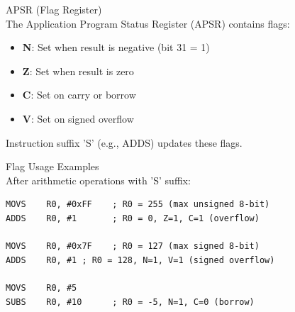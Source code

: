 \begin{definition}{APSR (Flag Register)}\\
The Application Program Status Register (APSR) contains flags:
\begin{itemize}
  \item \textbf{N}: Set when result is negative (bit 31 = 1)
  \item \textbf{Z}: Set when result is zero
  \item \textbf{C}: Set on carry or borrow
  \item \textbf{V}: Set on signed overflow
\end{itemize}

Instruction suffix 'S' (e.g., ADDS) updates these flags.
\end{definition}

\begin{example2}{Flag Usage Examples}\\
After arithmetic operations with 'S' suffix:
\begin{lstlisting}[language=armasm, style=basesmol]
MOVS    R0, #0xFF    ; R0 = 255 (max unsigned 8-bit)
ADDS    R0, #1       ; R0 = 0, Z=1, C=1 (overflow)

MOVS    R0, #0x7F    ; R0 = 127 (max signed 8-bit)
ADDS    R0, #1 ; R0 = 128, N=1, V=1 (signed overflow)

MOVS    R0, #5
SUBS    R0, #10      ; R0 = -5, N=1, C=0 (borrow)
\end{lstlisting}
\end{example2}

